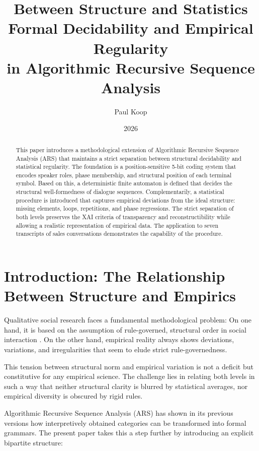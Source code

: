 \documentclass[
  12pt,
  a4paper,
  oneside,
  titlepage
]{article}
\title{\Huge\textbf{Between Structure and Statistics} \\
       \LARGE Formal Decidability and Empirical Regularity \\
       \LARGE in Algorithmic Recursive Sequence Analysis}
\author{
  \large
  \begin{tabular}{c}
    Paul Koop
  \end{tabular}
}
\date{\large 2026}
\begin{document}
\maketitle

\begin{abstract}
This paper introduces a methodological extension of Algorithmic Recursive 
Sequence Analysis (ARS) that maintains a strict separation between structural 
decidability and statistical regularity. The foundation is a position-sensitive 
5-bit coding system that encodes speaker roles, phase membership, and structural 
position of each terminal symbol. Based on this, a deterministic finite automaton 
is defined that decides the structural well-formedness of dialogue sequences. 
Complementarily, a statistical procedure is introduced that captures empirical 
deviations from the ideal structure: missing elements, loops, repetitions, and 
phase regressions. The strict separation of both levels preserves the XAI 
criteria of transparency and reconstructibility while allowing a realistic 
representation of empirical data. The application to seven transcripts of sales 
conversations demonstrates the capability of the procedure.
\end{abstract}

\newpage
\tableofcontents
\newpage

\section{Introduction: The Relationship Between Structure and Empirics}

Qualitative social research faces a fundamental methodological problem: On one 
hand, it is based on the assumption of rule-governed, structural order in social 
interaction \citep{Oevermann1979, Sacks1974}. On the other hand, empirical reality 
always shows deviations, variations, and irregularities that seem to elude strict 
rule-governedness.

This tension between structural norm and empirical variation is not a deficit but 
constitutive for any empirical science. The challenge lies in relating both levels 
in such a way that neither structural clarity is blurred by statistical averages, 
nor empirical diversity is obscured by rigid rules.

Algorithmic Recursive Sequence Analysis (ARS) has shown in its previous versions 
how interpretively obtained categories can be transformed into formal grammars. 
The present paper takes this a step further by introducing an explicit bipartite 
structure:
\end{document}

